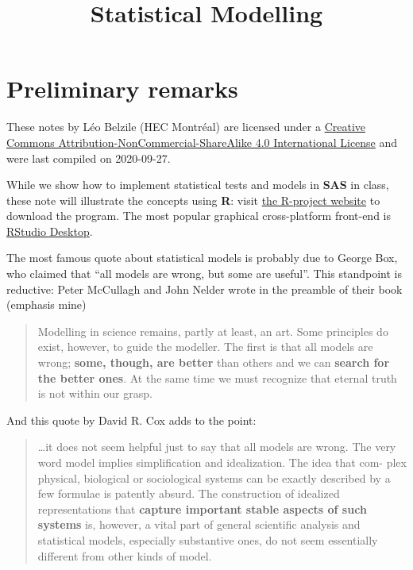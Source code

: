 \documentclass[
  11pt,
  letterpaper,
]{book}
\title{Statistical Modelling}
\author{}
\date{\vspace{-2.5em}}
\let\oldhref\href
\renewcommand{\href}[2]{#2\footnote{\url{#1}}}
\theoremstyle{definition}
\theoremstyle{definition}
\theoremstyle{definition}
\theoremstyle{remark}
\begin{document}
\maketitle

\let\href\oldhref

{
\setcounter{tocdepth}{1}
\tableofcontents
}
\hypertarget{preliminary-remarks}{%
\chapter*{Preliminary remarks}\label{preliminary-remarks}}

These notes by Léo Belzile (HEC Montréal) are licensed under a \href{http://creativecommons.org/licenses/by-nc-sa/4.0/}{Creative Commons Attribution-NonCommercial-ShareAlike 4.0 International License} and were last compiled on 2020-09-27.

While we show how to implement statistical tests and models in \textbf{SAS} in class, these note will illustrate the concepts using \textbf{R}: visit \href{https://cran.r-project.org/}{the R-project website} to download the program. The most popular graphical cross-platform front-end is \href{https://www.rstudio.com/products/rstudio/download/}{RStudio Desktop}.

The most famous quote about statistical models is probably due to George Box, who claimed that ``all models are wrong, but some are useful''. This standpoint is reductive: Peter McCullagh and John Nelder wrote in the preamble of their book (emphasis mine)

\begin{quote}
Modelling in science remains, partly at least, an art. Some principles do exist, however, to guide the modeller. The first is that all models are wrong; \textbf{some, though, are better} than others and we can \textbf{search for the better ones}. At the same time we must recognize that eternal truth is not within our grasp.
\end{quote}

And this quote by David R. Cox adds to the point:

\begin{quote}
\ldots it does not seem helpful just to say that all models are wrong. The very word model implies simplification and idealization. The idea that com-
plex physical, biological or sociological systems can be exactly described
by a few formulae is patently absurd. The construction of idealized representations that \textbf{capture important stable aspects of such systems}
is, however, a vital part of general scientific analysis and statistical models, especially substantive ones, do not seem essentially different from
other kinds of model.
\end{quote}
\end{document}
